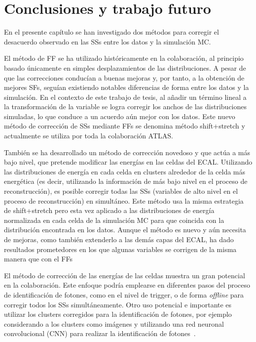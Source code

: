 \section{Conclusiones y trabajo futuro}
\label{sec:ss_corrections:summary}

En el presente capítulo se han investigado dos métodos para corregir el desacuerdo observado en las \acfp{SS} entre los datos y la simulación \ac{MC}.

El método de \acf{FF} se ha utilizado históricamente en la colaboración, al principio basado únicamente en simples desplazamientos de las distribuciones. A pesar de que las correcciones conducían a buenas mejoras y, por tanto, a la obtención de mejores \acp{SF}, seguían existiendo notables diferencias de forma entre los datos y la simulación. En el contexto de este trabajo de tesis, al añadir un término lineal a la transformación de la variable se logra corregir los anchos de las distribuciones simuladas, lo que conduce a un acuerdo aún mejor con los datos. Este nuevo método de corrección de \acp{SS} mediante \acp{FF} se denomina método shift+stretch y actualmente se utiliza por toda la colaboración \ac{ATLAS}.

También se ha desarrollado un método de corrección novedoso y que actúa a más bajo nivel, que pretende modificar las energías en las celdas del \ac{ECAL}. Utilizando las distribuciones de energía en cada celda en clusters alrededor de la celda más energética (es decir, utilizando la información de más bajo nivel en el proceso de reconstrucción), es posible corregir todas las \acp{SS} (variables de alto nivel en el proceso de reconstrucción) en simultáneo. Este método usa la misma estrategia de shift+stretch pero esta vez aplicado a las distribuciones de energía normalizada en cada celda de la simulación \ac{MC} para que coincida con la distribución encontrada en los datos. Aunque el método es nuevo y aún necesita de mejoras, como también extenderlo a las demás capas del \ac{ECAL}, ha dado resultados prometedores en los que algunas variables se corrigen de la misma manera que con el \acp{FF}

El método de corrección de las energías de las celdas muestra un gran potencial en la colaboración. Este enfoque podría emplearse en diferentes pasos del proceso de identificación de fotones, como en el nivel de trigger, o de forma \textit{offline} para corregir todos los \acp{SS} simultáneamente. Otro uso potencial e importante es utilizar los clusters corregidos para la identificación de fotones, por ejemplo considerando a los clusters como imágenes y utilizando una red neuronal convolucional (CNN) para realizar la identificación de fotones~\cite{thesis_belfkir}.

